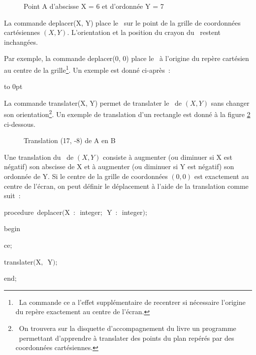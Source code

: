 \begin{figure}[htbp]
 \caption{Point A d'abscisse X = 6 et d'ordonnée Y = 7}
 \label{fig:coorA}
\end{figure}

La commande {\idt deplacer(X, Y)} place le \robot\ sur le point de la grille de coordonnées cartésiennes $(X, Y)$. 
L'orientation et la position du crayon du \robot\ restent inchangées. 

Par exemple, la commande {\idt deplacer(0, 0)} place le \robot\ à l'origine du repère
cartésien au centre de la grille\footnote{\ La commande {\idt ce} a l'effet supplémentaire
de recentrer si nécessaire l'origine du repère exactement au centre de l'écran.}. 
Un exemple est donné ci-après~:

\clearpage
\vspace*{-1cm}
 {\raggedright 
 \vbox to 0pt{\vspace*{\baselineskip}\vspace*{6cm}%
 }%
 \label{prog:LigneDeCarres1}
 
 }

La commande {\idt translater(X, Y)} permet de translater le \robot\ de $(X, Y)$
sans changer son orientation\footnote{\ On trouvera sur la disquette d'accompagnement du livre un programme
\pascal\ permettant d'apprendre à translater des points du plan 
repérés par des coordonnées cartésiennes.}. Un exemple de translation d'un rectangle est donné à la figure 
\ref{fig:extrans} ci-dessous.
\begin{figure}[h]
%
 \caption{Translation (17, -8) de A en B}\label{fig:extrans}
\end{figure}
\newpage
Une translation du \robot\ de $(X, Y)$ consiste à augmenter (ou diminuer si X est négatif)
son abscisse de X et à augmenter (ou diminuer si Y est négatif)
son ordonnée de Y. Si le centre de la grille de coordonnées $(0, 0)$ est exactement au centre
de l'écran, on peut définir le déplacement à l'aide de la translation comme suit~:

{
\parindent {}
\medskip

\vspace{\neglskip}\mbox{\blc  \blk\blk\idt  \mcl procedure\idt \ deplacer$($X\ $:$\ integer$;$\ Y\ $:$\ integer$)$$;$}\par 
\vspace{\neglskip}\mbox{\blc  \blk\blk\idt  \mcl begin\idt }\par 
\vspace{\neglskip}\mbox{\blc  \blk\blk\blk\idt  ce$;$}\par 
\vspace{\neglskip}\mbox{\blc  \blk\blk\blk\idt  translater$($X$,$\ Y$)$$;$}\par 
\vspace{\neglskip}\mbox{\blc  \blk\blk\idt  \mcl end\idt $;$}\par 

\medskip }

